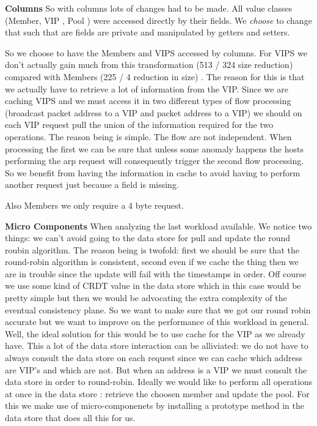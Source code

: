 \textbf{Columns} 
So with columns lots of changes had to be made.
All value classes (Member, VIP , Pool ) were accessed directly by
their fields.  We \emph{choose} to change that such that are fields
are private and manipulated by getters and setters. 

So we choose to have the Members and VIPS accessed by columns. 
For VIPS we don't actually gain much from this transformation (513 /
324 size reduction)   compared with Members (225 / 4 reduction in
size) . The reason for this is that we actually have to retrieve a lot
of information from the VIP. Since we are caching VIPS and we must
access it in two different types of flow processing (broadcast packet
address to a VIP and packet address to a  VIP) we should on each VIP
request  pull the union of the information required for the two
operations. The reason being is simple. The flow are not
independent. When processing the first we can be sure that unless some
anomaly happens the hosts performing the arp request will consequently
trigger the second flow processing. So we benefit from having the
information in cache to avoid having to perform another request just
because a field is missing. 

Also Members we only require a 4 byte request. 


\textbf{Micro Components} When analyzing the last workload available. We notice two things: we
can't avoid going to the data store for pull and update the round
roubin algorithm. The reason being is twofold: first we should be
sure that the round-robin algorithm is consistent, second even if we
cache the thing then we are in trouble since the update will fail with
the timestamps in order. Off course we use some kind of CRDT value in
the data store which in this case would be pretty simple but then we
would be advocating the extra complexity of the eventual consistency
plane.  So we want to make sure that we got our round robin accurate
but we want to improve on the performance of this workload in
general.  Well, the ideal solution for this would be to use cache for
the VIP as we already have. This a lot of the data store interaction
can be alliviated: we do not have to always consult the data store on
each request since we can cache which address are VIP's and which are
not.  But when an address is a VIP we must consult the data store in
order to round-robin. Ideally we would like to perform all operations
at once in the data store : retrieve the choosen member and update the
pool.  For this we make use of micro-componenets by installing a
prototype method in the data store that does all this for us. 



